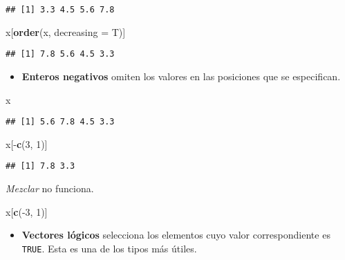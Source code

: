 \documentclass[]{article}
\newenvironment{Shaded}{\begin{snugshade}}{\end{snugshade}}
\newcommand{\KeywordTok}[1]{\textcolor[rgb]{0.13,0.29,0.53}{\textbf{{#1}}}}
\newcommand{\DataTypeTok}[1]{\textcolor[rgb]{0.13,0.29,0.53}{{#1}}}
\newcommand{\DecValTok}[1]{\textcolor[rgb]{0.00,0.00,0.81}{{#1}}}
\newcommand{\NormalTok}[1]{{#1}}
\begin{document}
\begin{verbatim}
## [1] 3.3 4.5 5.6 7.8
\end{verbatim}

\begin{Shaded}
\begin{Highlighting}[]
\NormalTok{x[}\KeywordTok{order}\NormalTok{(x, }\DataTypeTok{decreasing =} \NormalTok{T)]}
\end{Highlighting}
\end{Shaded}

\begin{verbatim}
## [1] 7.8 5.6 4.5 3.3
\end{verbatim}

\begin{itemize}
\itemsep1pt\parskip0pt
\item
  \textbf{Enteros negativos} omiten los valores en las posiciones que se
  especifican.
\end{itemize}

\begin{Shaded}
\begin{Highlighting}[]
\NormalTok{x}
\end{Highlighting}
\end{Shaded}

\begin{verbatim}
## [1] 5.6 7.8 4.5 3.3
\end{verbatim}

\begin{Shaded}
\begin{Highlighting}[]
\NormalTok{x[-}\KeywordTok{c}\NormalTok{(}\DecValTok{3}\NormalTok{, }\DecValTok{1}\NormalTok{)]}
\end{Highlighting}
\end{Shaded}

\begin{verbatim}
## [1] 7.8 3.3
\end{verbatim}

\emph{Mezclar} no funciona.

\begin{Shaded}
\begin{Highlighting}[]
\NormalTok{x[}\KeywordTok{c}\NormalTok{(-}\DecValTok{3}\NormalTok{, }\DecValTok{1}\NormalTok{)]}
\end{Highlighting}
\end{Shaded}

\begin{itemize}
\itemsep1pt\parskip0pt
\item
  \textbf{Vectores lógicos} selecciona los elementos cuyo valor
  correspondiente es \texttt{TRUE}. Esta es una de los tipos más útiles.
\end{itemize}
\end{document}
